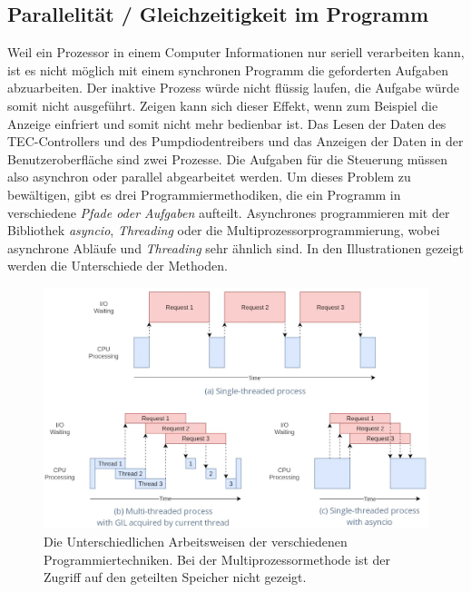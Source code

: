 
\subsection{Parallelität / Gleichzeitigkeit im Programm}
\label{concurrency}
Weil ein Prozessor in einem Computer Informationen nur seriell verarbeiten kann, ist es nicht möglich mit einem synchronen Programm die geforderten Aufgaben abzuarbeiten. Der  inaktive Prozess würde nicht flüssig laufen, die Aufgabe würde somit nicht ausgeführt. Zeigen kann sich dieser Effekt, wenn zum Beispiel die Anzeige einfriert und somit nicht mehr bedienbar ist. Das Lesen der Daten des TEC-Controllers und des Pumpdiodentreibers und das Anzeigen der Daten in der Benutzeroberfläche sind zwei Prozesse. Die Aufgaben für die Steuerung müssen also asynchron oder parallel abgearbeitet werden. Um dieses Problem zu bewältigen, gibt es drei Programmiermethodiken, die ein Programm in verschiedene \textit{Pfade oder Aufgaben} aufteilt. Asynchrones programmieren mit der Bibliothek \textit{asyncio}, \textit{Threading} oder die Multiprozessorprogrammierung, wobei asynchrone Abläufe und \textit{Threading} sehr ähnlich sind. In den Illustrationen gezeigt werden die Unterschiede der Methoden.

\begin{figure}[H]
    \centering
    \includegraphics[scale=0.4]{98_images/thread_vs_async_vs_single.png}  %
    \caption{Die Unterschiedlichen Arbeitsweisen der verschiedenen Programmiertechniken. Bei der Multiprozessormethode ist der Zugriff auf den geteilten Speicher nicht gezeigt.}
    \label{fig:multi_threading_async}
\end{figure}

